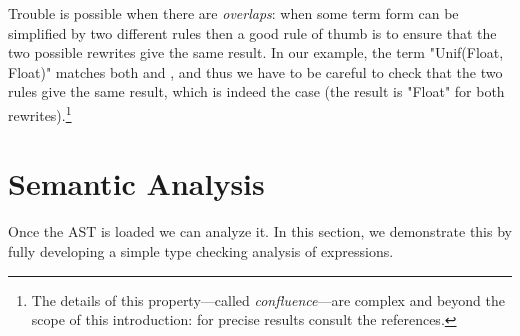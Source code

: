 \documentclass[11pt]{article} %
\begin{document}
\begin{example}
Trouble is possible when there are \emph{overlaps}: when some term form can be simplified by two
different rules then a good rule of thumb is to ensure that the two possible rewrites give the same
result.  In our example, the term "Unif(Float, Float)" matches both  and
, and thus we have to be careful to check that the two rules give the same result,
which is indeed the case (the result is "Float" for both rewrites).\footnote{The details of this
  property---called \emph{confluence}---are complex and beyond the scope of this introduction: for
  precise results consult the references.}
\end{example}

\section{Semantic Analysis}
\label{sec:analysis}

Once the AST is loaded we can analyze it.  In this section, we demonstrate this by fully developing
a simple type checking analysis of expressions.
\end{document}
